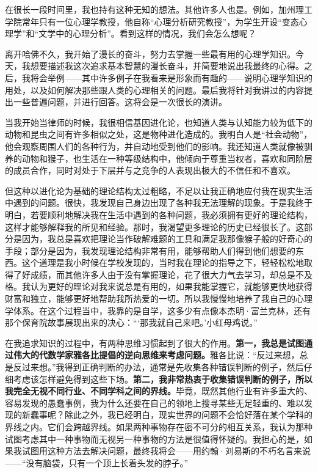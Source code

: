 在很长一段时间里，我也持有这种无知的想法。其他许多人也是。例如，加州理工学院常年只有一位心理学教授，他自称“心理分析研究教授”，为学生开设“变态心理学”和“文学中的心理分析”。看到这样的情况，我们会怎么想呢？
\par

离开哈佛不久，我开始了漫长的奋斗，努力去掌握一些最有用的心理学知识。今天，我想要描述我这次追求基本智慧的漫长奋斗，并简要地说出我最终的心得。之后，我将会举例——其中许多例子在我看来是形象而有趣的——说明心理学知识的用处，以及如何解决那些跟人类的心理相关的问题。最后我将针对我讲过的内容提出一些普遍问题，并进行回答。这将会是一次很长的演讲。
\par

当我开始当律师的时候，我很相信基因进化论，也知道人类与认知能力较为低下的动物和昆虫之间有许多相似之处，这是物种进化造成的。我明白人是“社会动物”，他会观察周围人们的各种行为，并自动地受到他们的影响。我还知道人类就像被驯养的动物和猴子，也生活在一种等级结构中，他倾向于尊重当权者，喜欢和同阶层的成员合作，同时对处于下层并与之竞争的人表现出极大的不信任和不喜欢。
\par

但这种以进化论为基础的理论结构太过粗略，不足以让我正确地应付我在现实生活中遇到的问题。很快，我发现自己身边出现了各种我无法理解的现象。于是我终于明白，若要顺利地解决我在生活中遇到的各种问题，我必须拥有更好的理论结构，这样才能够解释我的所见和经验。那时，我渴望更多理论的历史已经很长了。这部分是因为，我总是喜欢把理论当作破解难题的工具和满足我那像猴子般的好奇心的手段；部分是因为，我发现理论结构非常有用，能够帮助人们得到他们想要的东西。这个道理是我小时候在学校发现的，当时我在理论的指导之下，轻轻松松地取得了好成绩，而其他许多人由于没有掌握理论，花了很大力气去学习，却总是不及格。我认为更好的理论对我来说总是有用的，如果我能掌握它，就能够更快地获得财富和独立，能够更好地帮助我所热爱的一切。所以我慢慢地培养了我自己的心理学体系。在这个过程当中，我靠的是自学，这多少有点像本杰明·富兰克林，还有那个保育院故事展现出来的决心：“‘那我就自己来吧。’小红母鸡说。”
\par

在我追求知识的过程中，有两种思维习惯起到了很大的作用。\textbf{第一，我总是试图通过伟大的代数学家雅各比提倡的逆向思维来考虑问题。}雅各比说：“反过来想，总是反过来想。”我得到正确判断的办法，通常是先收集各种错误判断的例子，然后仔细考虑该怎样避免得到这些下场。\textbf{第二，我非常热衷于收集错误判断的例子，所以我完全无视不同行业、不同学科之间的界线。}毕竟，既然其他行业有许多重大的、容易发现的愚蠢事例，我为什么还要在自己的领地上搜寻某些无足轻重的、难以发现的新蠢事呢？除此之外，我已经明白，现实世界的问题不会恰好落在某个学科的界线之内。它们会跨越界线。如果两种事物存在密不可分的相互关系，我认为那种试图考虑其中一种事物而无视另一种事物的方法是很值得怀疑的。我担心的是，如果我试图用这种方法去解决问题，最终我将会——用约翰·刘易斯的不朽名言来说——“没有脑袋，只有一个顶上长着头发的脖子。”
\par

